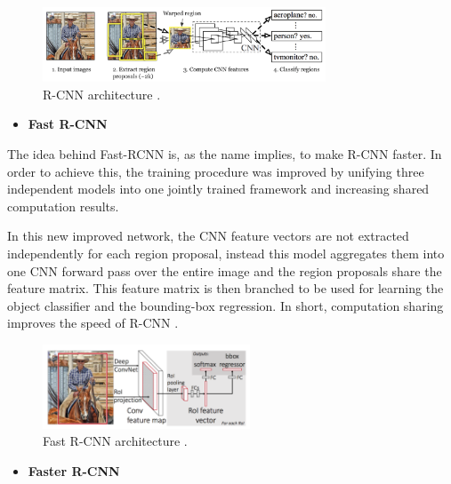     \begin{figure}[H]
        \centering
        \captionsetup{justification=centering}
        \includegraphics[width=0.75\textwidth]{Sections/2StateOfTheArt/2_images/RCNN.png}
        \caption[R-CNN architecture]{R-CNN architecture \cite{weng2017detection3}.} 
    \end{figure}

    \begin{itemize}
        \item\textbf{Fast R-CNN}
    \end{itemize}
    

    \par The idea behind Fast-RCNN \cite{girshick2015fast} is, as the name implies, to make  R-CNN faster. In order to achieve this, the training procedure was improved by unifying three independent models into one jointly trained framework and increasing shared computation results.
    \par In this new improved network, the CNN feature vectors are not extracted independently for each region proposal, instead this model aggregates them into one CNN forward pass over the entire image and the region proposals share the feature matrix. This feature matrix is then branched to be used for learning the object classifier and the bounding-box regression. In short, computation sharing improves the speed of R-CNN \cite{weng2017detection3}.

    \begin{figure}[H]
        \centering
        \captionsetup{justification=centering}
        \includegraphics[width=0.55\textwidth]{Sections/2StateOfTheArt/2_images/fast-RCNN.png}
        \caption[Fast R-CNN architecture]{Fast R-CNN architecture \cite{weng2017detection3}.} 
    \end{figure}

    \begin{itemize}
        \item\textbf{Faster R-CNN}
    \end{itemize}
    
